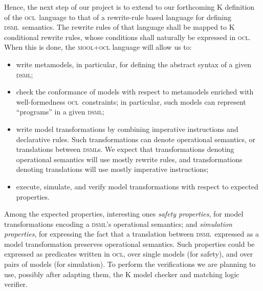 \documentclass[a4paper,11pt,twoside]{article}
\newcommand{\dsml}{\textsc{dsml}}
\newcommand{\dsmls}{\textsc{dsml}s}
\newcommand{\ocl}{\textsc{ocl}}
\begin{document}
Hence, the next step of our project is to extend to our forthcoming K definition of the \ocl\ language to that of a rewrite-rule based language for defining \dsml\ semantics. The rewrite
rules of that language shall be  mapped to K conditional rewrite rules, whose conditions shall naturally be expressed in \ocl. When this is done, the  \textsc{mool+ocl}  language will 
allow us to:
\begin{itemize}
\item write metamodels, in particular, for defining the abstract syntax of a given \dsml;
\item check the conformance of models with respect to  metamodels enriched with well-formedness \ocl\ constraints; in particular, such models can represent ``programs'' in a given \dsml;
\item write model transformations by combining imperative instructions and declarative rules. Such transformations can denote operational semantics, 
or translations between   \dsmls. We expect that  transformations denoting operational semantics will use mostly rewrite rules, and  transformations denoting translations will use mostly imperative instructions;
\item execute, simulate, and verify model transformations with respect to expected properties.
\end{itemize}
Among the expected properties, interesting ones \emph{safety properties}, for model transformations encoding a \dsml's operational semantics; and \emph{simulation properties}, for expressing the fact that a translation between \dsml\ expressed as a model transformation 
preserves operational semantics. Such properties could be expressed as predicates written in \ocl, over single models (for safety), and over pairs of models (for simulation). To perform the verifications we are planning to use, possibly after adapting them, the K model checker and matching logic verifier.


\end{document}
